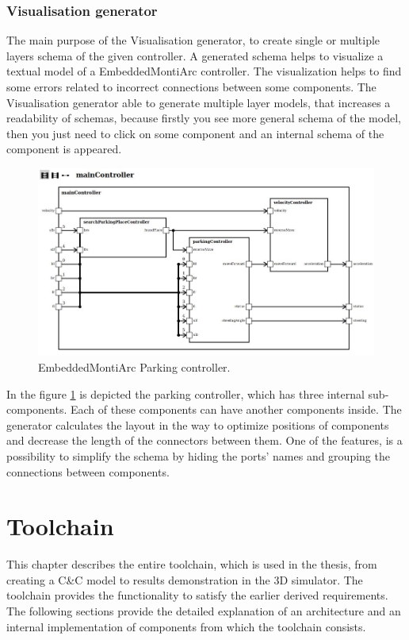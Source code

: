 \subsection{Visualisation generator} \label{sec:svggen}
The main purpose of the Visualisation generator, to create single or multiple layers schema of the given controller. A generated schema helps to visualize a textual model of a EmbeddedMontiArc controller. The visualization helps to find some errors related to incorrect connections between some components. The Visualisation generator able to generate multiple layer models, that increases a readability of schemas, because firstly you see more general schema of the model, then you just need to click on some component and an internal schema of the component is appeared.
\begin{figure}[h!]
    \centering
    \includegraphics[width=\linewidth]{src/pic/controller03}
    \caption{EmbeddedMontiArc Parking controller.}
    \label{fig:parkingCtrl}
\end{figure}
In the figure \ref{fig:parkingCtrl} is depicted the parking controller, which has three internal sub-components. Each of these components can have another components inside. The generator calculates the layout in the way to optimize positions of components and decrease the length of the connectors between them. One of the features, is a possibility to simplify the schema by hiding the ports' names and grouping the connections between components.

\chapter{Toolchain} \label{sec:toolchain}
This chapter describes the entire toolchain, which is used in the thesis, from creating a C\&C model to results demonstration in the 3D simulator. The toolchain provides the functionality to satisfy the earlier derived requirements. The following sections provide the detailed explanation of an architecture and an internal implementation of components from which the toolchain consists.

